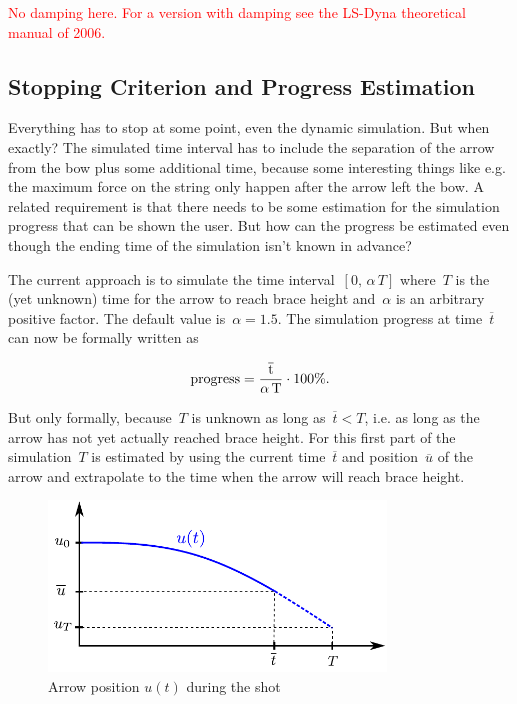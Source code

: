 \textcolor{red}{No damping here. For a version with damping see the LS-Dyna theoretical manual of 2006.}

\subsection{Stopping Criterion and Progress Estimation}

Everything has to stop at some point, even the dynamic simulation. But when exactly?
The simulated time interval has to include the separation of the arrow from the bow plus some additional time, because some interesting things like e.g. the maximum force on the string only happen after the arrow left the bow.
A related requirement is that there needs to be some estimation for the simulation progress that can be shown the user.
But how can the progress be estimated even though the ending time of the simulation isn't known in advance?

The current approach is to simulate the time interval~$[0,\,\alpha\,T]$ where~$T$ is the (yet unknown) time for the arrow to reach brace height and~$\alpha$ is an arbitrary positive factor.
The default value is~$\alpha = 1.5$. The simulation progress at time~$\overline{t}$ can now be formally written as

\begin{equation}
\rm{progress} = \frac{\overline{t}}{\alpha\,T}\cdot 100\%.\label{eq:solution:progress}
\end{equation}

But only formally, because~$T$ is unknown as long as~$\overline{t} < T$, i.e. as long as the arrow has not yet actually reached brace height. For this first part of the simulation~$T$ is estimated by using the current time~$\overline{t}$ and position~$\overline{u}$ of the arrow and extrapolate to the time when the arrow will reach brace height.

\begin{figure}[h]
\centering
\includegraphics[width=0.8\textwidth]{figures/solution/dynamic_progress}
\caption{Arrow position $u(t)$ during the shot}
\label{fig:solution:dynamic_progress}
\end{figure}

